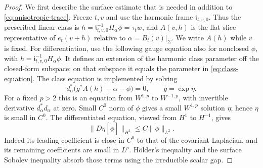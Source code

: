 \documentclass[11pt]{amsart}
\theoremstyle{definition}
\theoremstyle{remark}
\theoremstyle{plain}
\numberwithin{equation}{section}
\begin{document}
\begin{proof}
We first describe the surface estimate that is needed in addition to
\eqref{eq:anisotropic-trace}. Freeze $t,v$ and use the harmonic frame
$\mathfrak i_{t,v,0}$. Thus the prescribed linear class is
$h=\mathfrak i_{t,v,0}^{-1}H_\alpha\phi=\tau_tw$, and $A(v,h)$
is the flat slice representative of $e_t(v+h)$ relative to
$\alpha=B_t(v)|_\Sigma$. We write $A(h)$ while $v$ is fixed.
For differentiation, use the following gauge equation also for
nonclosed $\phi$, with $h=\mathfrak i_{t,v,0}^{-1}H_\alpha\phi$.
It defines an extension of the harmonic class parameter off the
closed-form subspace; on that subspace it equals the parameter in
\eqref{eq:class-equation}. The class equation is
implemented by solving
\[
d_\alpha^*\bigl(g^*A(h)-\alpha-\phi\bigr)=0,
\qquad g=\exp\eta.
\]
For a fixed $p>2$ this is an equation from $W^{1,p}$ to
$W^{-1,p}$, with invertible derivative $d_\alpha^*d_\alpha$ at
zero. Small $C^0$ norm of $\phi$ gives a small $W^{1,p}$ solution
$\eta$; hence $\eta$ is small in $C^0$. The differentiated equation,
viewed from $H^1$ to $H^{-1}$, gives
\[
\|D\eta[\dot\phi]\|_{H^1}\le C\|\dot\phi\|_{L^2}.
\]
Indeed its leading coefficient is close in $C^0$ to that of the
covariant Laplacian, and its remaining coefficients are small in
$L^p$. H\"older's inequality and the surface Sobolev inequality
absorb those terms using the irreducible scalar gap.


\end{proof}
\end{document}

